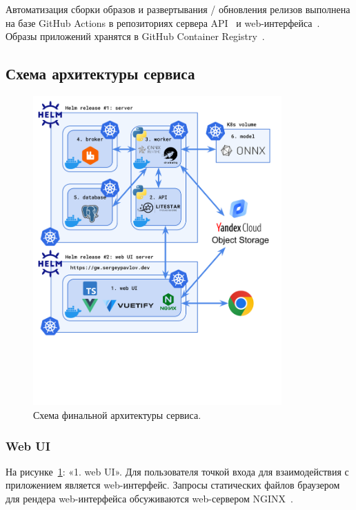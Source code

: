 \documentclass[a4paper,12pt]{extarticle}
\begin{document}
Автоматизация сборки образов и развертывания / обновления релизов выполнена на базе GitHub Actions в
репозиториях сервера API~\cite{server_CI} и web-интерфейса~\cite{web_UI_CI}. Образы приложений
хранятся в GitHub Container Registry~\cite{github_packages}.

\newpage
\subsection{Схема архитектуры сервиса}

\begin{figure}[ht]
	\centering
	\includegraphics[width=0.85\textwidth,trim={0 3.5cm 0 0}]{final_arch.png}
	\caption{Схема финальной архитектуры сервиса.}
	\label{fig:final_arch}
\end{figure}

\subsubsection{Web UI}

На рисунке~\ref{fig:final_arch}: «1. web UI». Для пользователя точкой входа для взаимодействия с
приложением является web-интерфейс. Запросы статических файлов браузером для рендера web-интерфейса
обсуживаются web-сервером NGINX~\cite{NGINX}.
\end{document}
